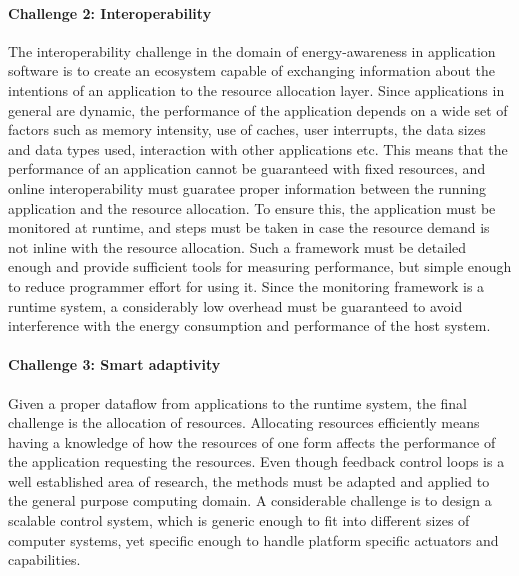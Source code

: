 \documentclass{article}
\begin{document}
\paragraph{Challenge 2: Interoperability}
\label{sec:inter}
The interoperability challenge in the domain of energy-awareness in application software is to create an ecosystem capable of exchanging information about the intentions of an application to the resource allocation layer. 
Since applications in general are dynamic, the performance of the application depends on a wide set of factors such as memory intensity, use of caches, user interrupts, the data sizes and data types used, interaction with other applications etc. 
This means that the performance of an application cannot be guaranteed with fixed resources, and online interoperability must guaratee proper information between the running application and the resource allocation.
To ensure this, the application must be monitored at runtime, and steps must be taken in case the resource demand is not inline with the resource allocation.
Such a framework must be detailed enough and provide sufficient tools for measuring performance, but simple enough to reduce programmer effort for using it.
Since the monitoring framework is a runtime system, a considerably low overhead must be guaranteed to avoid interference with the energy consumption and performance of the host system.

\paragraph{Challenge 3: Smart adaptivity}
\label{sec:smart}
Given a proper dataflow from applications to the runtime system, the final challenge is the allocation of resources. 
Allocating resources efficiently means having a knowledge of how the resources of one form affects the performance of the application requesting the resources.
Even though feedback control loops is a well established area of research, the methods must be adapted and applied to the general purpose computing domain. 
A considerable challenge is to design a scalable control system, which is generic enough to fit into different sizes of computer systems, yet specific enough to handle platform specific actuators and capabilities.
\end{document}
